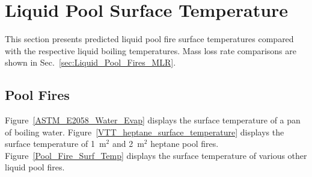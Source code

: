 %
%

\clearpage

\section{Liquid Pool Surface Temperature}
\label{sec:Liquid_Pool_Surf_Temp}

This section presents predicted liquid pool fire surface temperatures compared with the respective liquid boiling temperatures. Mass loss rate comparisons are shown in Sec.~\ref{sec:Liquid_Pool_Fires_MLR}.

\subsection{Pool Fires}

Figure~\ref{ASTM_E2058_Water_Evap} displays the surface temperature of a pan of boiling water. Figure~\ref{VTT_heptane_surface_temperature} displays the surface temperature of 1~m$^2$ and 2~m$^2$ heptane pool fires. Figure~\ref{Pool_Fire_Surf_Temp} displays the surface temperature of various other liquid pool fires.

